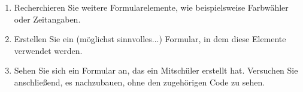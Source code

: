 \documentclass[11pt, a4paper, oneside]{article}
\begin{document}
	\lines[8cm]
	
	
	
	\begin{enumerate}[label=\alph*)]
		\item Recherchieren Sie weitere Formularelemente, wie beispielsweise Farbwähler oder Zeitangaben.
		\item Erstellen Sie ein (möglichst sinnvolles...) Formular, in dem diese Elemente verwendet werden.
		\item Sehen Sie sich ein Formular an, das ein Mitschüler erstellt hat.
		Versuchen Sie anschließend, es nachzubauen, ohne den zugehörigen Code zu sehen.
	\end{enumerate}
	
\end{document}
